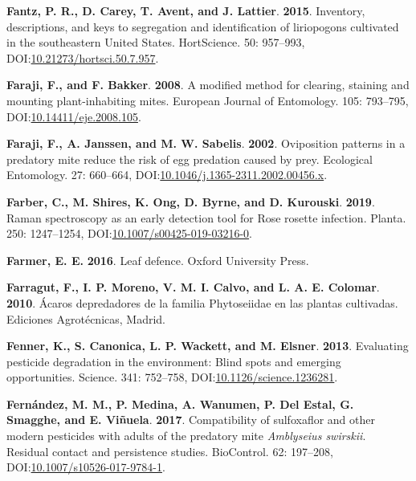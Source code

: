 \documentclass[12pt,final,CPage]{ufthesis}
\newlength{\cslhangindent}
\newenvironment{CSLReferences}[2] %
{%
	\setlength{\parindent}{0pt}
	\ifodd #1 \everypar{\setlength{\hangindent}{\cslhangindent}}\ignorespaces\fi
	\ifnum #2 > 0
	\setlength{\parskip}{#2\baselineskip}
	\fi
}%
{}
\begin{document}
{\begin{CSLReferences}{1}{0}
  \leavevmode{}%
  \textbf{Fantz, P. R., D. Carey, T. Avent, and J. Lattier}. \textbf{2015}. Inventory, descriptions, and keys to segregation and identification of liriopogons cultivated in the southeastern {United States}. {HortScience}. 50: 957--993, DOI:\href{https://doi.org/10.21273/hortsci.50.7.957}{10.21273/hortsci.50.7.957}.

  \leavevmode{}%
  \textbf{Faraji, F., and F. Bakker}. \textbf{2008}. A modified method for clearing, staining and mounting plant-inhabiting mites. European Journal of Entomology. 105: 793--795, DOI:\href{https://doi.org/10.14411/eje.2008.105}{10.14411/eje.2008.105}.

  \leavevmode{}%
  \textbf{Faraji, F., A. Janssen, and M. W. Sabelis}. \textbf{2002}. Oviposition patterns in a predatory mite reduce the risk of egg predation caused by prey. Ecological Entomology. 27: 660--664, DOI:\href{https://doi.org/10.1046/j.1365-2311.2002.00456.x}{10.1046/j.1365-2311.2002.00456.x}.

  \leavevmode{}%
  \textbf{Farber, C., M. Shires, K. Ong, D. Byrne, and D. Kurouski}. \textbf{2019}. {Raman} spectroscopy as an early detection tool for {Rose rosette} infection. Planta. 250: 1247--1254, DOI:\href{https://doi.org/10.1007/s00425-019-03216-0}{10.1007/s00425-019-03216-0}.

  \leavevmode{}%
  \textbf{Farmer, E. E.} \textbf{2016}. Leaf defence. Oxford University Press.

  \leavevmode{}%
  \textbf{Farragut, F., I. P. Moreno, V. M. I. Calvo, and L. A. E. Colomar}. \textbf{2010}. {Á}caros depredadores de la familia {Phytoseiidae} en las plantas cultivadas. Ediciones Agrot{é}cnicas, Madrid.

  \leavevmode{}%
  \textbf{Fenner, K., S. Canonica, L. P. Wackett, and M. Elsner}. \textbf{2013}. Evaluating pesticide degradation in the environment: Blind spots and emerging opportunities. Science. 341: 752--758, DOI:\href{https://doi.org/10.1126/science.1236281}{10.1126/science.1236281}.

  \leavevmode{}%
  \textbf{Fernández, M. M., P. Medina, A. Wanumen, P. Del Estal, G. Smagghe, and E. Viñuela}. \textbf{2017}. Compatibility of sulfoxaflor and other modern pesticides with adults of the predatory mite {\emph{Amblyseius swirskii}}. Residual contact and persistence studies. {BioControl}. 62: 197--208, DOI:\href{https://doi.org/10.1007/s10526-017-9784-1}{10.1007/s10526-017-9784-1}.


\end{CSLReferences}}
\end{document}
